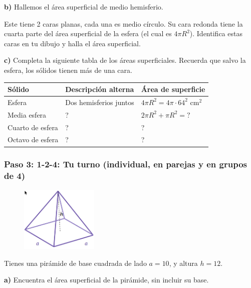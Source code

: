 \documentclass[12pt,a4paper]{article}
\begin{document}
\textbf{b)} Hallemos el área superficial de medio hemisferio.

Este tiene 2 caras planas, cada una es medio círculo. Su cara redonda tiene la cuarta parte del área superficial de la esfera (el cual es $4\pi R^2$). Identifica estas caras en tu dibujo y halla el área superficial.

\textbf{c)} Completa la siguiente tabla de los áreas superficiales. Recuerda que salvo la esfera, los sólidos tienen más de una cara.

\begin{center}
\begin{tabular}{|p{3.5cm}|p{4.5cm}|p{4.5cm}|}
\hline
\textbf{Sólido} & \textbf{Descripción alterna} & \textbf{Área de superficie} \\
\hline
Esfera & Dos hemisferios juntos & $4\pi R^2 = 4\pi \cdot 64^2$ cm$^2$ \\
\hline
Media esfera & ? & $2\pi R^2 + \pi R^2 = ?$ \\
\hline
Cuarto de esfera & ? & ? \\
\hline
Octavo de esfera & ? & ? \\
\hline
\end{tabular}
\end{center}

\vspace{4mm}


\subsubsection*{Paso 3: 1-2-4: Tu turno (individual, en parejas y en grupos de 4)}

\begin{figure}
\centering
\includegraphics[width=0.33\textwidth]{Figuras/fig77.png}
\end{figure}

Tienes una pirámide de base cuadrada de lado $a = 10$, y altura $h = 12$.

\textbf{a)} Encuentra el área superficial de la pirámide, sin incluir su base.
\end{document}
